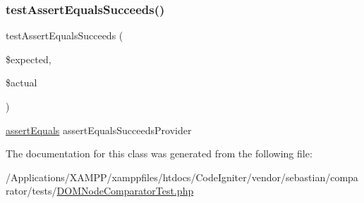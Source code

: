\subsubsection{\texorpdfstring{test\+Assert\+Equals\+Succeeds()}{testAssertEqualsSucceeds()}}
{\footnotesize\ttfamily test\+Assert\+Equals\+Succeeds (\begin{DoxyParamCaption}\item[{}]{\$expected,  }\item[{}]{\$actual }\end{DoxyParamCaption})}

\mbox{\hyperlink{_functions_8php_a441ec5f09711b6271edda774132eec5f}{assert\+Equals}}  assert\+Equals\+Succeeds\+Provider 

The documentation for this class was generated from the following file\+:\begin{DoxyCompactItemize}
\item 
/\+Applications/\+X\+A\+M\+P\+P/xamppfiles/htdocs/\+Code\+Igniter/vendor/sebastian/comparator/tests/\mbox{\hyperlink{_d_o_m_node_comparator_test_8php}{D\+O\+M\+Node\+Comparator\+Test.\+php}}\end{DoxyCompactItemize}
